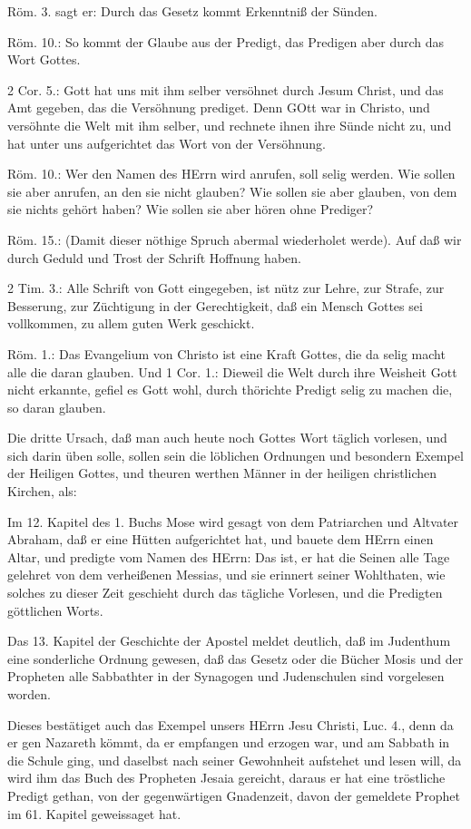 Röm. 3. sagt er: Durch das Gesetz kommt Erkenntniß der Sünden.

Röm. 10.: So kommt der Glaube aus der Predigt, das Predigen aber durch das Wort Gottes.

2 Cor. 5.: Gott hat uns mit ihm selber versöhnet durch Jesum Christ, und das Amt gegeben, das die Versöhnung prediget. Denn GOtt war in Christo, und versöhnte die Welt mit ihm selber, und rechnete ihnen ihre Sünde nicht zu, und hat unter uns aufgerichtet das Wort von der Versöhnung.

Röm. 10.: Wer den Namen des HErrn wird anrufen, soll selig werden. Wie sollen sie aber anrufen, an den sie nicht glauben? Wie sollen sie aber glauben, von dem sie nichts gehört haben? Wie sollen sie aber hören ohne Prediger?

Röm. 15.: (Damit dieser nöthige Spruch abermal wiederholet werde). Auf daß wir durch Geduld und Trost der Schrift Hoffnung haben.

2 Tim. 3.: Alle Schrift von Gott eingegeben, ist nütz zur Lehre, zur Strafe, zur Besserung, zur Züchtigung in der Gerechtigkeit, daß ein Mensch Gottes sei vollkommen, zu allem guten Werk geschickt.

Röm. 1.: Das Evangelium von Christo ist eine Kraft Gottes, die da selig macht alle die daran glauben. Und 1 Cor. 1.: Dieweil die Welt durch ihre Weisheit Gott nicht erkannte, gefiel es Gott wohl, durch thörichte Predigt selig zu machen die, so daran glauben.

Die dritte Ursach, daß man auch heute noch Gottes Wort täglich vorlesen, und sich darin üben solle, sollen sein die löblichen Ordnungen und besondern Exempel der Heiligen Gottes, und theuren werthen Männer in der heiligen christlichen Kirchen, als:

Im 12. Kapitel des 1. Buchs Mose wird gesagt von dem Patriarchen und Altvater Abraham, daß er eine Hütten aufgerichtet hat, und bauete dem HErrn einen Altar, und predigte vom Namen des HErrn: Das ist, er hat die Seinen alle Tage gelehret von dem verheißenen Messias, und sie erinnert seiner Wohlthaten, wie solches zu dieser Zeit geschieht durch das tägliche Vorlesen, und die Predigten göttlichen Worts.

Das 13. Kapitel der Geschichte der Apostel meldet deutlich, daß im Judenthum eine sonderliche Ordnung gewesen, daß das Gesetz oder die Bücher Mosis und der Propheten alle Sabbathter in der Synagogen und Judenschulen sind vorgelesen worden.

Dieses bestätiget auch das Exempel unsers HErrn Jesu Christi, Luc. 4., denn da er gen Nazareth kömmt, da er empfangen und erzogen war, und am Sabbath in die Schule ging, und daselbst nach seiner Gewohnheit aufstehet und lesen will, da wird ihm das Buch des Propheten Jesaia gereicht, daraus er hat eine tröstliche Predigt gethan, von der gegenwärtigen Gnadenzeit, davon der gemeldete Prophet im 61. Kapitel geweissaget hat.

